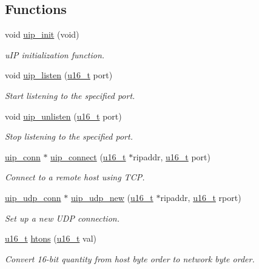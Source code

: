 \subsection*{Functions}
\begin{CompactItemize}
\item 
void \hyperlink{a00062_gc48ed5f0d27721ef62a3ed02a5ad8d2e}{uip\_\-init} (void)
\begin{CompactList}\small\item\em u\-IP initialization function. \item\end{CompactList}\item 
void \hyperlink{a00064_gdd1ab3704ecd4900eec61a6897d32dc8}{uip\_\-listen} (\hyperlink{a00070_gfc6499c1f28697aa3bfc2804d496fd11}{u16\_\-t} port)
\begin{CompactList}\small\item\em Start listening to the specified port. \item\end{CompactList}\item 
void \hyperlink{a00064_gaa585784b0914cac1d37f07f85457008}{uip\_\-unlisten} (\hyperlink{a00070_gfc6499c1f28697aa3bfc2804d496fd11}{u16\_\-t} port)
\begin{CompactList}\small\item\em Stop listening to the specified port. \item\end{CompactList}\item 
\hyperlink{a00028}{uip\_\-conn} $\ast$ \hyperlink{a00064_gce715881b240922bba96613c2a88fd67}{uip\_\-connect} (\hyperlink{a00070_gfc6499c1f28697aa3bfc2804d496fd11}{u16\_\-t} $\ast$ripaddr, \hyperlink{a00070_gfc6499c1f28697aa3bfc2804d496fd11}{u16\_\-t} port)
\begin{CompactList}\small\item\em Connect to a remote host using TCP. \item\end{CompactList}\item 
\hyperlink{a00032}{uip\_\-udp\_\-conn} $\ast$ \hyperlink{a00064_g527ff0e535266167077b06d3a4742822}{uip\_\-udp\_\-new} (\hyperlink{a00070_gfc6499c1f28697aa3bfc2804d496fd11}{u16\_\-t} $\ast$ripaddr, \hyperlink{a00070_gfc6499c1f28697aa3bfc2804d496fd11}{u16\_\-t} rport)
\begin{CompactList}\small\item\em Set up a new UDP connection. \item\end{CompactList}\item 
\hyperlink{a00070_gfc6499c1f28697aa3bfc2804d496fd11}{u16\_\-t} \hyperlink{a00065_ga22b04cac8cf283ca12f028578bebc06}{htons} (\hyperlink{a00070_gfc6499c1f28697aa3bfc2804d496fd11}{u16\_\-t} val)
\begin{CompactList}\small\item\em Convert 16-bit quantity from host byte order to network byte order. \item\end{CompactList}\end{CompactItemize}
